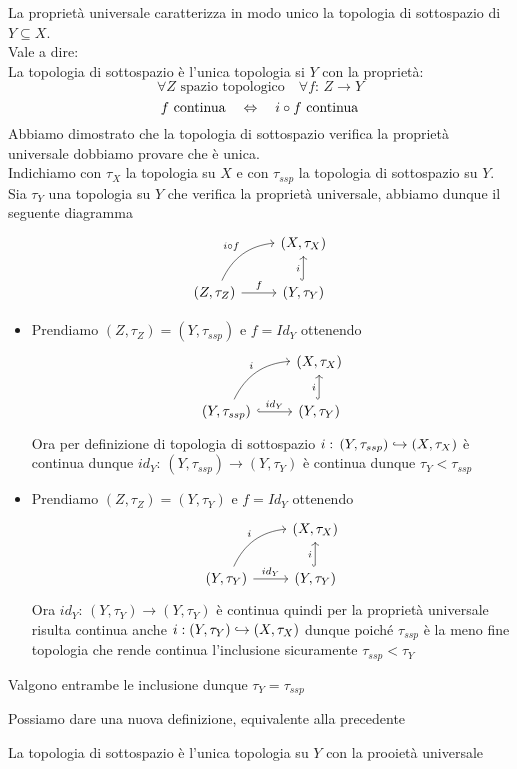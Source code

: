 \begin{thm}La propriet\`a universale caratterizza in modo unico la topologia di sottospazio di $Y \subseteq X$.\\
Vale a dire:\\
La topologia di sottospazio \`e l'unica topologia si $Y$ con la propriet\`a:
$$ \forall Z \text{ spazio topologico} \quad \forall f:\, Z \to Y $$
$$ f \text{ continua} \quad \Leftrightarrow \quad i \circ f \text{ continua}$$
\proof 
Abbiamo dimostrato che la topologia di sottospazio verifica la propriet\`a universale dobbiamo provare che \`e unica.\\
Indichiamo con $\tau_X$ la topologia su $X$ e con  $\tau_{ssp}$ la topologia di sottospazio su $Y$.\\
Sia $\tau_Y$ una topologia su $Y$ che verifica la propriet\`a universale, abbiamo dunque il seguente diagramma 
$$\begin{tikzcd} & (X, \tau_X) \\
(Z,\tau_Z) \arrow[bend left]{ur}{i \circ f} \arrow[r,"f"] &(Y,\tau_Y) \arrow[u, "i",hook]
\end{tikzcd}$$
\begin{itemize}
\item 
Prendiamo $(Z, \tau_Z)=(Y,\tau_{ssp})$ e $f=Id_Y$
ottenendo 
$$\begin{tikzcd} & (X, \tau_X) \\
(Y,\tau_{ssp}) \arrow[bend left]{ur}{i } \arrow[hook]{r}{id_Y} &(Y,\tau_Y) \arrow[u, "i",hook]
\end{tikzcd}$$
Ora per definizione di topologia di sottospazio $i:\, (Y,\tau_{ssp}) \hookrightarrow (X,\tau_X)$ \`e continua dunque $id_Y:\, (Y,\tau_{ssp}) \to (Y,\tau_Y)$ \`e continua dunque $\tau_{Y}<\tau_{ssp}$
\item Prendiamo $(Z,\tau_Z)= (Y,\tau_Y) $ e $f=Id_Y$ ottenendo
$$\begin{tikzcd} & (X, \tau_X) \\
(Y,\tau_{Y}) \arrow[bend left]{ur}{i } \arrow{r}{id_Y} &(Y,\tau_Y) \arrow[u, "i",hook]
\end{tikzcd}$$
Ora $id_Y:\, (Y,\tau_Y) \to (Y, \tau_Y)$ \`e continua quindi per la propriet\`a universale risulta continua anche $i:(Y,\tau_Y)\hookrightarrow (X,\tau_X)$ dunque poich\'e $\tau_{ssp}$ \`e la meno fine topologia che rende continua l'inclusione sicuramente $\tau_{ssp}<\tau_Y$
\end{itemize}
Valgono entrambe le inclusione dunque $\tau_Y=\tau_{ssp}$
\endproof
\end{thm}
Possiamo dare una nuova definizione, equivalente alla precedente
\begin{defn}La topologia di sottospazio \`e l'unica topologia su $Y$ con la prooiet\`a universale
\end{defn}
\newpage
